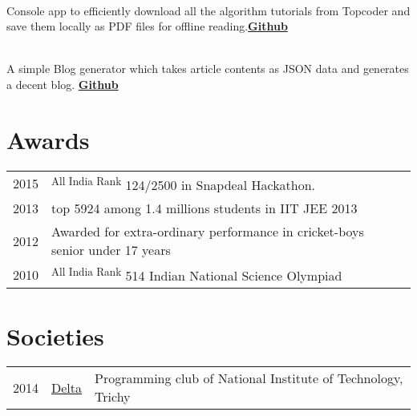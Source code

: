 \documentclass[]{deedy-resume-openfont}
\begin{document}
\begin{minipage}[t]{0.66\textwidth}
\\
Console app to efficiently download all the algorithm tutorials from Topcoder and save them locally as PDF files for offline reading.\textbf{\href{https://github.com/tushar-rishav/topcoder-dl}{Github}}
\sectionsep

\\
A simple Blog generator which takes article contents as JSON data and generates a decent blog.
\textbf{\href{https://github.com/tushar-rishav/Blogular}{Github}}
\sectionsep



\section{Awards} 
\begin{tabular}{rll}
2015     & \textsuperscript{All India Rank} 124/2500 in Snapdeal Hackathon.\\
2013	     & top 5924 among 1.4 millions students in IIT JEE 2013\\
2012     & Awarded for extra-ordinary performance in cricket-boys senior under 17 years\\
2010	     & \textsuperscript{All India Rank} 514 Indian National Science Olympiad\\
\end{tabular}
\sectionsep


\section{Societies} 

\begin{tabular}{rll}
2014   & {\href{https://github.com/delta}{Delta}} & Programming club of National Institute of Technology, Trichy\\
\end{tabular}
\sectionsep

\end{minipage} 
\end{document}
